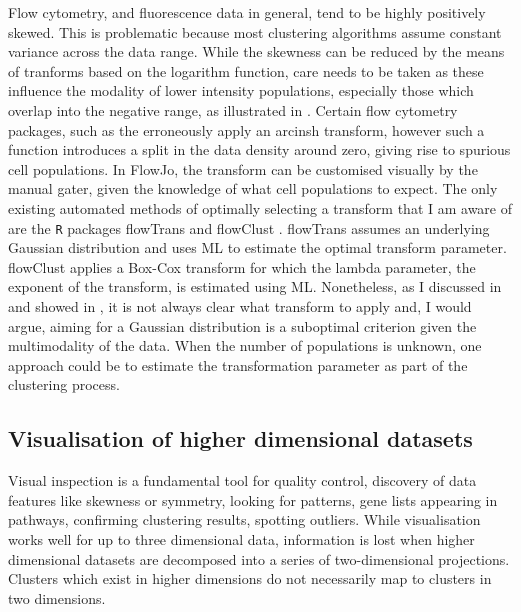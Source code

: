 Flow cytometry, and fluorescence data in general, tend to be highly positively skewed.
This is problematic because most clustering algorithms assume constant variance across the data range.
While the skewness can be reduced by the means of tranforms based on the logarithm function, care needs to be taken as these influence the modality of lower intensity populations, especially those which overlap into the negative range, as illustrated in .
Certain flow cytometry packages, such as the  erroneously apply an arcinsh transform, however such a function introduces a split in the data density around zero, giving rise to spurious cell populations.
In FlowJo, the transform can be customised visually by the manual gater, given the knowledge of what cell populations to expect.
The only existing automated  methods of optimally selecting a transform that I am aware of are the \texttt{R} packages \textsf{flowTrans} and \textsf{flowClust} \citep{flowTrans,flowClust}.
\textsf{flowTrans} assumes an underlying Gaussian distribution and uses \gls{ML} to estimate the optimal transform parameter.
\textsf{flowClust} applies a Box-Cox transform for which the lambda parameter, the exponent of the transform, is estimated using \gls{ML}.
Nonetheless, as I discussed in  and showed in , it is not always clear what transform to apply and, I would argue, aiming for a Gaussian distribution is a suboptimal criterion given the multimodality of the data.
When the number of populations is unknown, one approach could be to estimate the transformation parameter as part of the clustering process.


\subsection{Visualisation of higher dimensional datasets}

Visual inspection is a fundamental tool for quality control, discovery of data features like skewness or symmetry, looking for patterns, gene lists appearing in pathways, confirming clustering results, spotting outliers.
While visualisation works well for up to three dimensional data, information is lost when higher dimensional datasets are decomposed into a series of two-dimensional projections.
Clusters which exist in higher dimensions do not necessarily map to clusters in two dimensions.

